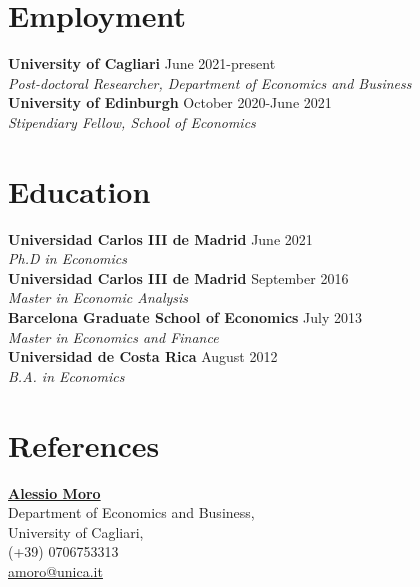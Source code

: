 \documentclass[margin]{res} %
\begin{document}
\begin{resume}

 
\section{Employment}
{\bf University of Cagliari} \hfill June 2021-present  \\
{\sl Post-doctoral Researcher, Department of Economics and Business} \\
{\bf University of Edinburgh} \hfill October 2020-June 2021  \\
{\sl Stipendiary Fellow, School of Economics} 


\section{Education}
{\bf Universidad Carlos III de Madrid} \hfill June 2021  \\
{\sl Ph.D in Economics} \\
{\bf Universidad Carlos III de Madrid} \hfill September 2016 \\
{\sl Master in Economic Analysis} \\
{\bf Barcelona Graduate School of Economics} \hfill July 2013 \\
{\sl Master in Economics and Finance}  \\
{\bf Universidad de Costa Rica} \hfill August 2012 \\
{\sl B.A. in Economics}

\section{References}
\begin{multicols}{2}
	
	\href{http://http://www.alessiomoro.it/}{\bf{Alessio Moro}} \\
	Department of Economics and Business, \\
	University of Cagliari, \\
	(+39) 0706753313 \\
	\href{mailto:amoro@unica.it}{amoro@unica.it}
	

\end{multicols}
\end{resume}
\end{document}
